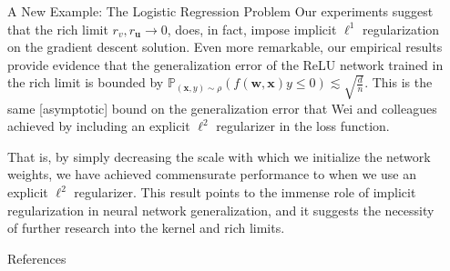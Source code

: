 \documentclass[final, 20pt]{beamer}
\newlength{\sepwidth}
\newlength{\colwidth}
\newcommand{\separatorcolumn}{\begin{column}{\sepwidth}\end{column}}
\begin{document}
\begin{frame}[t]
\begin{columns}[t]
\begin{column}{\colwidth}
\begin{block}{A New Example: The Logistic Regression Problem}
    Our experiments suggest that the rich limit $r_v, r_{\boldsymbol{u}} \rightarrow 0$, does, in fact, impose implicit $\ell^1$ regularization on the gradient descent solution. Even more remarkable, our empirical results provide evidence that the generalization error of the ReLU network trained in the rich limit is bounded by $\mathbb{P}_{(\boldsymbol{x}, y) \sim \rho}(f(\boldsymbol{w}, \boldsymbol{x})y \leq 0) \lesssim \sqrt{\frac{d}{n}}$. This is the same [asymptotic] bound on the generalization error that Wei and colleagues achieved by including an explicit $\ell^2$ regularizer in the loss function.
    
    That is, by simply decreasing the scale with which we initialize the network weights, we have achieved commensurate performance to when we use an explicit $\ell^2$ regularizer. This result points to the immense role of implicit regularization in neural network generalization, and it suggests the necessity of further research into the kernel and rich limits.
    \end{block}
  \begin{block}{References}
    \footnotesize{}
  \end{block}

\end{column}

\separatorcolumn
\end{columns}

\end{frame}
\end{document}
